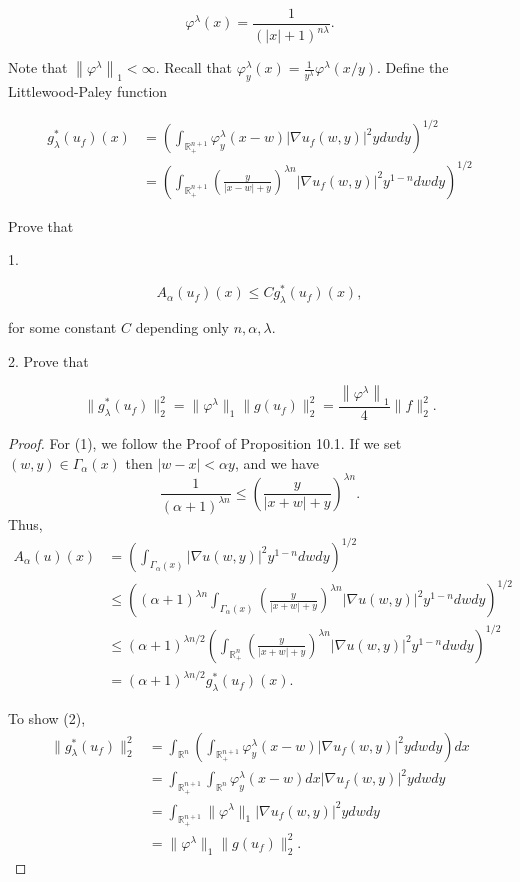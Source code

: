\begin{enumerate}
\[
\varphi^\lambda(x)=\frac{1}{(|x|+1)^{n \lambda}} .
\]


Note that $\left\|\varphi^\lambda\right\|_1<\infty$. Recall that $\varphi_y^\lambda(x)=\frac{1}{y^\lambda} \varphi^\lambda(x / y)$. Define the Littlewood-Paley function

\[
\begin{aligned}
g_\lambda^*\left(u_f\right)(x) & =\left(\int_{\mathbb{R}_{+}^{n+1}} \varphi_y^\lambda(x-w)\left|\nabla u_f(w, y)\right|^2 y d w d y\right)^{1 / 2} \\
& =\left(\int_{\mathbb{R}_{+}^{n+1}}\left(\frac{y}{|x-w|+y}\right)^{\lambda n}\left|\nabla u_f(w, y)\right|^2 y^{1-n} d w d y\right)^{1 / 2}
\end{aligned}
\]


Prove that

1.

\[
A_\alpha\left(u_f\right)(x) \leq C g_\lambda^*\left(u_f\right)(x),
\]

for some constant $C$ depending only $n, \alpha, \lambda$.

2. Prove that

\[
	\| g_\lambda^*\left(u_f\right)\|_2^2=\| \varphi^\lambda\|_1 \| g\left(u_f\right)\|_2^2=\frac{\left\|\varphi^\lambda\right\|_1}{4}\| f \|_2^2
.\]
\begin{proof}
	For (1), we follow the Proof of Proposition 10.1. If we set $(w, y) \in \Gamma_\alpha(x)$ then $|w - x| < \alpha y$, and we have
	\[
		\frac{1}{(\alpha + 1)^{\lambda n}} \le  \left( \frac{y}{|x + w| + y} \right) ^{\lambda n}
	.\] 
	Thus, 
	\begin{align*}
		A_\alpha (u) (x)
		&= \left( \int _{\Gamma_\alpha(x)} \left| \nabla  u(w, y) \right| ^2 y^{1 - n} d w d y \right) ^{1 / 2} \\
		&\le  \left((\alpha + 1)^{\lambda n} \int _{\Gamma_\alpha(x)} \left( \frac{y}{|x + w| + y} \right) ^{\lambda n} \left| \nabla  u(w, y) \right| ^2 y^{1 - n} d w d y \right) ^{1 / 2} \\
		&\le (\alpha + 1)^{\lambda n / 2}\left( \int _{\mathbb{R}^n_+} \left( \frac{y}{|x + w| + y} \right) ^{\lambda n} \left| \nabla  u(w, y) \right| ^2 y^{1 - n} d w d y \right) ^{1 / 2} \\
		&= (\alpha + 1)^{\lambda n / 2} g_\lambda^* (u_f)(x) 
	.\end{align*}

	To show (2), 
	\begin{align*}
		\| g_\lambda^*\left(u_f\right)\|_2^2
		&= \int _{\mathbb{R}^n} \left(\int_{\mathbb{R}_{+}^{n+1}} \varphi_y^\lambda(x-w)\left|\nabla u_f(w, y)\right|^2 y d w d y\right) d x\\
		&=  \int_{\mathbb{R}_{+}^{n+1}}\int _{\mathbb{R}^n} \varphi_y^\lambda(x-w)d x \left|\nabla u_f(w, y)\right|^2 y  d w d y \\
		&=  \int_{\mathbb{R}_{+}^{n+1}} \|\varphi^\lambda\|_1 \left|\nabla u_f(w, y)\right|^2 y  d w d y \\
		&=  \|\varphi^\lambda\|_1 \|g(u_f)\|_2^2
	.\end{align*}
\end{proof}


\end{enumerate}
